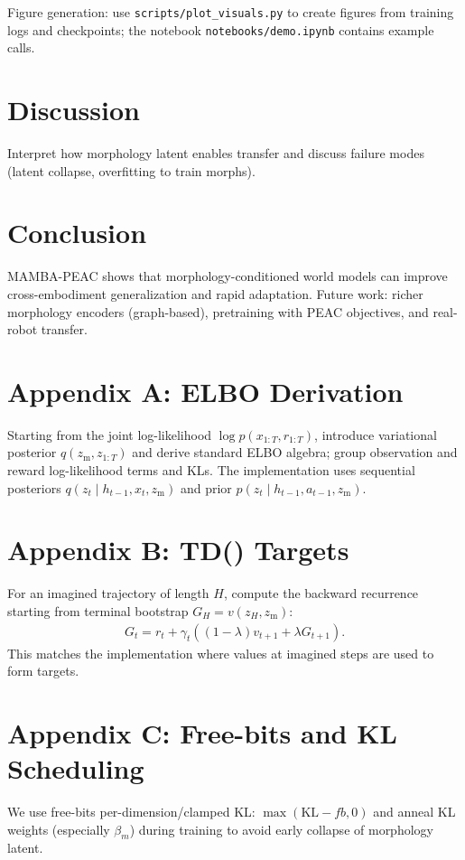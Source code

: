 \documentclass{article}
\begin{document}
Figure generation: use \texttt{scripts/plot_visuals.py} to create figures from training logs and checkpoints; the notebook \texttt{notebooks/demo.ipynb} contains example calls.

\section{Discussion}
Interpret how morphology latent enables transfer and discuss failure modes (latent collapse, overfitting to train morphs).

\section{Conclusion}
MAMBA-PEAC shows that morphology-conditioned world models can improve cross-embodiment generalization and rapid adaptation. Future work: richer morphology encoders (graph-based), pretraining with PEAC objectives, and real-robot transfer.

\appendix
\section{Appendix A: ELBO Derivation}
Starting from the joint log-likelihood $\log p(x_{1:T},r_{1:T})$, introduce variational posterior $q(z_{\mathrm{m}},z_{1:T})$ and derive standard ELBO algebra; group observation and reward log-likelihood terms and KLs. The implementation uses sequential posteriors $q(z_t\mid h_{t-1},x_t,z_{\mathrm{m}})$ and prior $p(z_t\mid h_{t-1},a_{t-1},z_{\mathrm{m}})$.

\section{Appendix B: TD(\lambda) Targets}
For an imagined trajectory of length $H$, compute the backward recurrence starting from terminal bootstrap $G_H = v(z_H,z_{\mathrm{m}})$:
\begin{align}
G_t = r_t + \gamma_t((1-\lambda)v_{t+1} + \lambda G_{t+1}).
\end{align}
This matches the implementation where values at imagined steps are used to form targets.

\section{Appendix C: Free-bits and KL Scheduling}
We use free-bits per-dimension/clamped KL: $\max(\mathrm{KL}-fb,0)$ and anneal KL weights (especially $\beta_m$) during training to avoid early collapse of morphology latent.
\end{document}
